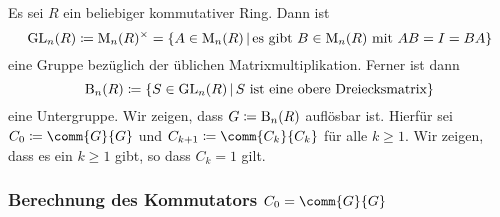 Es sei $R$ ein beliebiger kommutativer Ring.
Dann ist
\[
            \GL{n}{R}
  \coloneqq \matrices{n}{R}^\times
  =         \{
              A \in \matrices{n}{R}
            \suchthat
              \text{es gibt $B \in \matrices{n}{R}$ mit $AB = I = BA$}
            \}
\]
eine Gruppe bezüglich der üblichen Matrixmultiplikation.
Ferner ist dann
\[
            \Borel{n}{R}
  \coloneqq  \{
              S \in \GL{n}{R}
            \suchthat
              \text{$S$ ist eine obere Dreiecksmatrix}
            \}
\]
eine Untergruppe.
Wir zeigen, dass $G \coloneqq \operatorname{B}_{n}(R)$ auflösbar ist.
Hierfür sei $C_0 \coloneqq \comm{G}{G}$ und $C_{k+1} \coloneqq \comm{C_k}{C_k}$ für alle $k \geq 1$.
Wir zeigen, dass es ein $k \geq 1$ gibt, so dass $C_k = 1$ gilt.



\subsubsection*{Berechnung des Kommutators $C_0 = \comm{G}{G}$}

